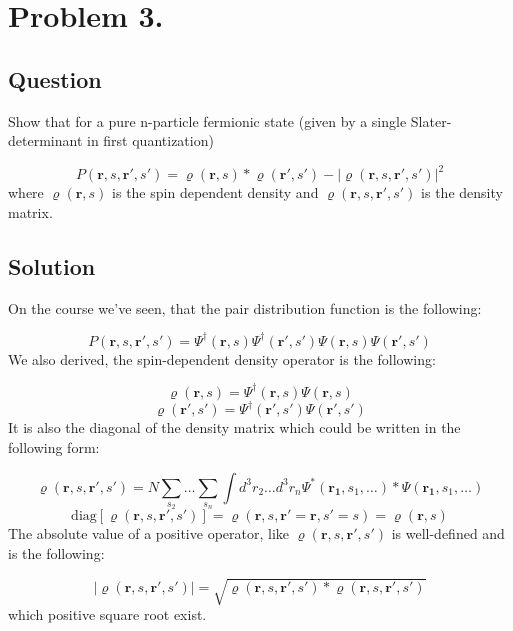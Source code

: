 \section*{Problem 3.}
\subsection*{Question}
Show that for a pure n-particle fermionic state (given by a single Slater-determinant in first quantization)

\begin{equation}
P \left( \boldsymbol{r}, s, \boldsymbol{r'}, s' \right)
=
\varrho \left( \boldsymbol{r}, s \right) * \varrho \left( \boldsymbol{r'}, s' \right)
-
\left| \varrho \left( \boldsymbol{r}, s, \boldsymbol{r'}, s' \right) \right|^{2}
\end{equation}
where $\varrho \left( \boldsymbol{r}, s \right)$ is the spin dependent density and $\varrho \left( \boldsymbol{r}, s, \boldsymbol{r'}, s' \right)$ is the density matrix.

\subsection*{Solution}
On the course we've seen, that the pair distribution function is the following:

\begin{equation}
P \left( \boldsymbol{r}, s, \boldsymbol{r'}, s' \right)
=
\Psi^{\dagger} \left( \boldsymbol{r}, s \right)
\Psi^{\dagger} \left( \boldsymbol{r'}, s' \right)
\Psi \left( \boldsymbol{r}, s \right)
\Psi \left( \boldsymbol{r'}, s' \right)
\end{equation}
We also derived, the spin-dependent density operator is the following:

\begin{equation}
\varrho \left( \boldsymbol{r}, s \right)
=
\Psi^{\dagger} \left( \boldsymbol{r}, s \right)
\Psi \left( \boldsymbol{r}, s \right)
\end{equation}
\begin{equation}
\varrho \left( \boldsymbol{r'}, s' \right)
=
\Psi^{\dagger} \left( \boldsymbol{r'}, s' \right)
\Psi \left( \boldsymbol{r'}, s' \right)
\end{equation}
It is also the diagonal of the density matrix which could be written in the following form:

\begin{equation}
\varrho \left( \boldsymbol{r}, s, \boldsymbol{r'}, s' \right)
=
N \sum_{s_{2}} \dots \sum_{s_{n}}
\int d^{3} r_{2} \dots d^{3} r_{n}
\Psi^{\ast} \left( \boldsymbol{r_{1}}, s_{1}, \dots \right) * \Psi \left( \boldsymbol{r_{1}}, s_{1}, \dots \right)
\end{equation}
\begin{equation}
\text{diag} \left[ \varrho \left( \boldsymbol{r}, s, \boldsymbol{r'}, s' \right) \right]
=
\varrho \left( \boldsymbol{r}, s, \boldsymbol{r'} = \boldsymbol{r}, s' = s \right)
=
\varrho \left( \boldsymbol{r}, s \right)
\end{equation}
The absolute value of a positive operator, like $\varrho \left( \boldsymbol{r}, s, \boldsymbol{r'}, s' \right)$ is well-defined and is the following:

\begin{equation}
\left| \varrho \left( \boldsymbol{r}, s, \boldsymbol{r'}, s' \right) \right|
=
\sqrt{\varrho \left( \boldsymbol{r}, s, \boldsymbol{r'}, s' \right) * \varrho \left( \boldsymbol{r}, s, \boldsymbol{r'}, s' \right)}
\end{equation}
which positive square root exist.